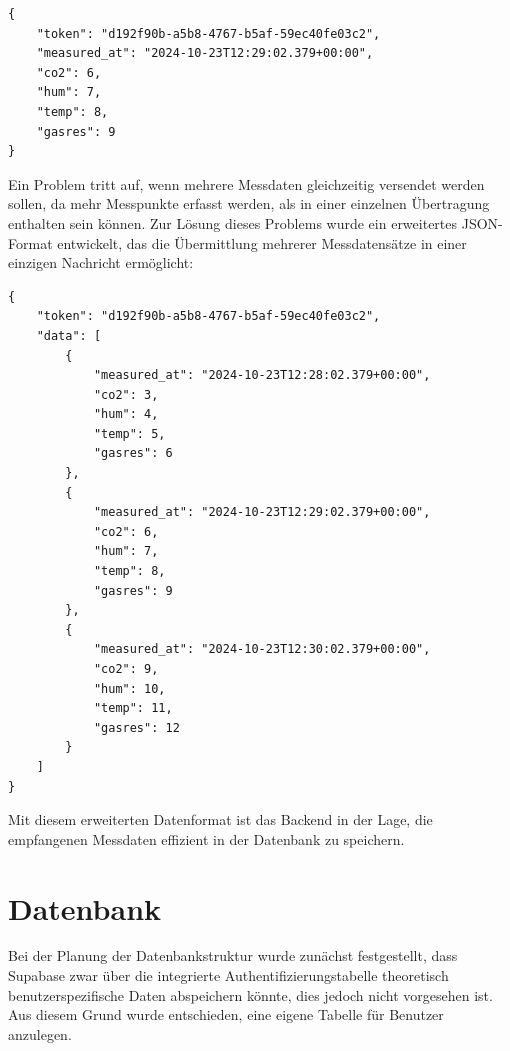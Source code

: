 \begin{inhalt}
\begin{lstlisting}[style=myjson]
{
    "token": "d192f90b-a5b8-4767-b5af-59ec40fe03c2",
    "measured_at": "2024-10-23T12:29:02.379+00:00",
    "co2": 6,
    "hum": 7,
    "temp": 8,
    "gasres": 9
}
\end{lstlisting}

\newpage

Ein Problem tritt auf, wenn mehrere Messdaten gleichzeitig versendet werden sollen, da mehr Messpunkte erfasst werden, als in einer einzelnen Übertragung enthalten sein können. Zur Lösung dieses Problems wurde ein erweitertes JSON-Format entwickelt, das die Übermittlung mehrerer Messdatensätze in einer einzigen Nachricht ermöglicht:

\begin{lstlisting}[style=myjson]
{
    "token": "d192f90b-a5b8-4767-b5af-59ec40fe03c2",
    "data": [
        {
            "measured_at": "2024-10-23T12:28:02.379+00:00",
            "co2": 3,
            "hum": 4,
            "temp": 5,
            "gasres": 6
        },
        {
            "measured_at": "2024-10-23T12:29:02.379+00:00",
            "co2": 6,
            "hum": 7,
            "temp": 8,
            "gasres": 9
        },
        {
            "measured_at": "2024-10-23T12:30:02.379+00:00",
            "co2": 9,
            "hum": 10,
            "temp": 11,
            "gasres": 12
        }
    ]
}
\end{lstlisting}

Mit diesem erweiterten Datenformat ist das Backend in der Lage, die empfangenen Messdaten effizient in der Datenbank zu speichern.

\newpage


\section{Datenbank}

\label{ref:profile-table-design}
Bei der Planung der Datenbankstruktur wurde zunächst festgestellt, dass Supabase zwar über die integrierte Authentifizierungstabelle theoretisch benutzerspezifische Daten abspeichern könnte, dies jedoch nicht vorgesehen ist. Aus diesem Grund wurde entschieden, eine eigene Tabelle für Benutzer anzulegen.


\end{inhalt}
